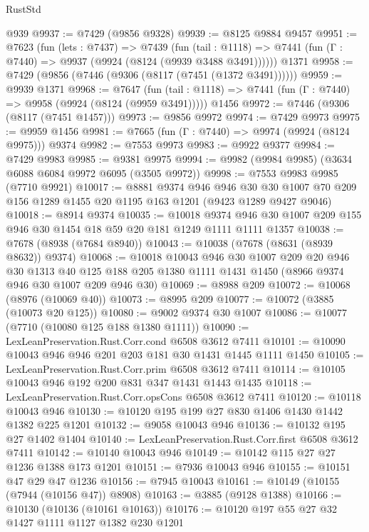 \begin{lexlean}{RustStd}
\begin{coremodule}
    @939
@9937 := @7429 (@9856 @9328)
@9939 := @8125 @9884 @9457
@9951 := @7623
    (fun (lets : @7437) =>
    @7439
      (fun (tail : @1118) => @7441 (fun (Γ : @7440) => @9937 (@9924 (@8124 (@9939 @3488 @3491))))))
    @1371
@9958 := @7429 (@9856 (@7446 (@9306 (@8117 (@7451 (@1372 @3491))))))
@9959 := @9939 @1371
@9968 := @7647
    (fun (tail : @1118) => @7441 (fun (Γ : @7440) => @9958 (@9924 (@8124 (@9959 @3491)))))
    @1456
@9972 := @7446 (@9306 (@8117 (@7451 @1457)))
@9973 := @9856 @9972
@9974 := @7429 @9973
@9975 := @9959 @1456
@9981 := @7665 (fun (Γ : @7440) => @9974 (@9924 (@8124 @9975))) @9374
@9982 := @7553 @9973
@9983 := @9922 @9377
@9984 := @7429 @9983
@9985 := @9381 @9975
@9994 := @9982 (@9984 @9985) (@3634 @6088 @6084 @9972 @6095 (@3505 @9972))
@9998 := @7553 @9983 @9985 (@7710 @9921)
@10017 := @8881
    @9374
    @946
    @946
    @30
    @30
    @1007
    @70
    @209
    @156
    @1289
    @1455
    @20
    @1195
    @163
    @1201
    (@9423 @1289 @9427 @9046)
@10018 := @8914 @9374
@10035 := @10018
    @9374
    @946
    @30
    @1007
    @209
    @155
    @946
    @30
    @1454
    @18
    @59
    @20
    @181
    @1249
    @1111
    @1111
    @1357
@10038 := @7678 (@8938 (@7684 @8940))
@10043 := @10038 (@7678 (@8631 (@8939 @8632)) @9374)
@10068 := @10018
    @10043
    @946
    @30
    @1007
    @209
    @20
    @946
    @30
    @1313
    @40
    @125
    @188
    @205
    @1380
    @1111
    @1431
    @1450
    (@8966 @9374 @946 @30 @1007 @209 @946 @30)
@10069 := @8988 @209
@10072 := @10068 (@8976 (@10069 @40))
@10073 := @8995 @209
@10077 := @10072 (@3885 (@10073 @20 @125))
@10080 := @9002 @9374 @30 @1007
@10086 := @10077 (@7710 (@10080 @125 @188 @1380 @1111))
@10090 := LexLeanPreservation.Rust.Corr.cond @6508 @3612 @7411
@10101 := @10090 @10043 @946 @946 @201 @203 @181 @30 @1431 @1445 @1111 @1450
@10105 := LexLeanPreservation.Rust.Corr.prim @6508 @3612 @7411
@10114 := @10105 @10043 @946 @192 @200 @831 @347 @1431 @1443 @1435
@10118 := LexLeanPreservation.Rust.Corr.opsCons @6508 @3612 @7411
@10120 := @10118 @10043 @946
@10130 := @10120 @195 @199 @27 @830 @1406 @1430 @1442 @1382 @225 @1201
@10132 := @9058 @10043 @946
@10136 := @10132 @195 @27 @1402 @1404
@10140 := LexLeanPreservation.Rust.Corr.first @6508 @3612 @7411
@10142 := @10140 @10043 @946
@10149 := @10142 @115 @27 @27 @1236 @1388 @173 @1201
@10151 := @7936 @10043 @946
@10155 := @10151 @47 @29 @47 @1236
@10156 := @7945 @10043
@10161 := @10149 (@10155 (@7944 (@10156 @47)) @8908)
@10163 := @3885 (@9128 @1388)
@10166 := @10130 (@10136 (@10161 @10163))
@10176 := @10120 @197 @55 @27 @32 @1427 @1111 @1127 @1382 @230 @1201

\end{coremodule}
\end{lexlean}
